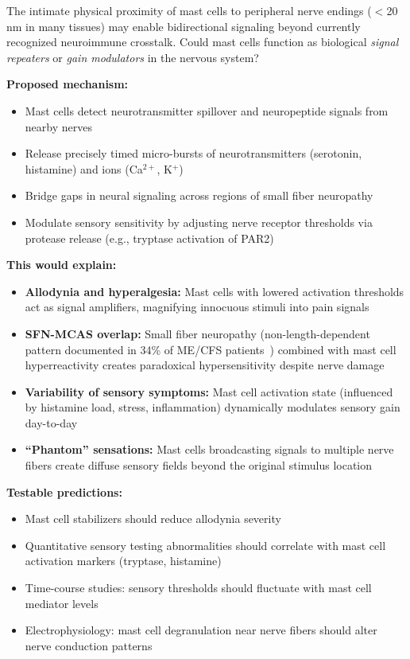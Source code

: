 \begin{open_question}
The intimate physical proximity of mast cells to peripheral nerve endings ($<$20 nm in many tissues) may enable bidirectional signaling beyond currently recognized neuroimmune crosstalk. Could mast cells function as biological \textit{signal repeaters} or \textit{gain modulators} in the nervous system?

\textbf{Proposed mechanism:}
\begin{itemize}
    \item Mast cells detect neurotransmitter spillover and neuropeptide signals from nearby nerves
    \item Release precisely timed micro-bursts of neurotransmitters (serotonin, histamine) and ions (Ca$^{2+}$, K$^+$)
    \item Bridge gaps in neural signaling across regions of small fiber neuropathy
    \item Modulate sensory sensitivity by adjusting nerve receptor thresholds via protease release (e.g., tryptase activation of PAR2)
\end{itemize}

\textbf{This would explain:}
\begin{itemize}
    \item \textbf{Allodynia and hyperalgesia:} Mast cells with lowered activation thresholds act as signal amplifiers, magnifying innocuous stimuli into pain signals
    \item \textbf{SFN-MCAS overlap:} Small fiber neuropathy (non-length-dependent pattern documented in 34\% of ME/CFS patients~\cite{Azcue2023sfn}) combined with mast cell hyperreactivity creates paradoxical hypersensitivity despite nerve damage
    \item \textbf{Variability of sensory symptoms:} Mast cell activation state (influenced by histamine load, stress, inflammation) dynamically modulates sensory gain day-to-day
    \item \textbf{``Phantom'' sensations:} Mast cells broadcasting signals to multiple nerve fibers create diffuse sensory fields beyond the original stimulus location
\end{itemize}

\textbf{Testable predictions:}
\begin{itemize}
    \item Mast cell stabilizers should reduce allodynia severity
    \item Quantitative sensory testing abnormalities should correlate with mast cell activation markers (tryptase, histamine)
    \item Time-course studies: sensory thresholds should fluctuate with mast cell mediator levels
    \item Electrophysiology: mast cell degranulation near nerve fibers should alter nerve conduction patterns
\end{itemize}


\end{open_question}
